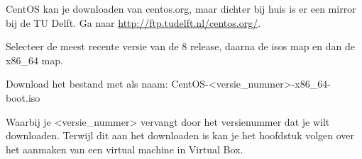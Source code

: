 CentOS kan je downloaden van centos.org, maar dichter bij huis is er een mirror bij de TU Delft. Ga naar
\url{http://ftp.tudelft.nl/centos.org/}.

Selecteer de meest recente versie van de 8 release, daarna de isos map en dan de x86\_64 map.

Download het bestand met als naam: CentOS-{\textless}versie\_nummer{\textgreater}-x86\_64-boot.iso

Waarbij je {\textless}versie\_nummer{\textgreater} vervangt door het versienummer dat je wilt downloaden. Terwijl dit aan
het downloaden is kan je het hoofdstuk volgen over het aanmaken van een virtual machine in Virtual Box.

